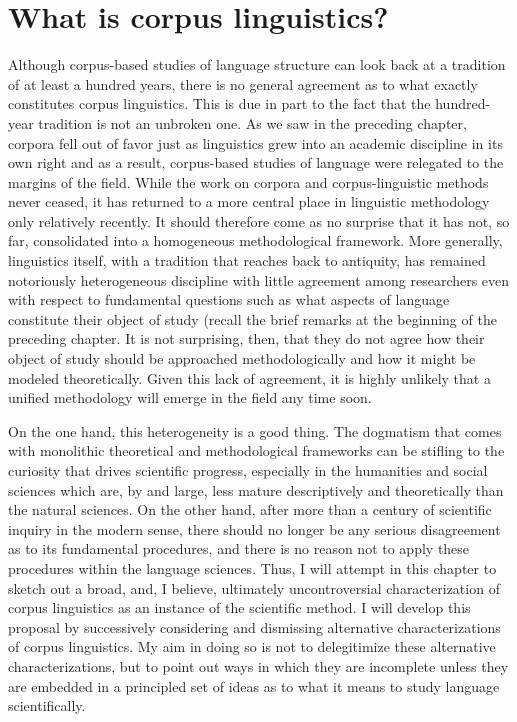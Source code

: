\chapter{What is corpus linguistics?}
\label{ch:corpuslinguistics}

Although corpus-based studies of language structure can look back at a tradition of at least a hundred years, there is no general agreement as to what exactly constitutes corpus linguistics. This is due in part to the fact that the hundred-year tradition is not an unbroken one. As we saw in the preceding chapter, corpora fell out of favor just as linguistics grew into an academic discipline in its own right and as a result, corpus-based studies of language were relegated to the margins of the field. While the work on corpora and corpus-linguistic methods never ceased, it has returned to a more central place in linguistic methodology only relatively recently. It should therefore come as no surprise that it has not, so far, consolidated into a homogeneous methodological framework. More generally, linguistics itself, with a tradition that reaches back to antiquity, has remained notoriously heterogeneous discipline with little agreement among researchers even with respect to fundamental questions such as what aspects of language constitute their object of study (recall the brief remarks at the beginning of the preceding chapter. It is not surprising, then, that they do not agree how their object of study should be approached methodologically and how it might be modeled theoretically. Given this lack of agreement, it is highly unlikely that a unified methodology will emerge in the field any time soon.

On the one hand, this heterogeneity is a good thing. The dogmatism that comes with monolithic theoretical and methodological frameworks can be stifling to the curiosity that drives scientific progress, especially in the humanities and social sciences which are, by and large, less mature descriptively and theoretically than the natural sciences. On the other hand, after more than a century of scientific inquiry in the modern sense, there should no longer be any serious disagreement as to its fundamental procedures, and there is no reason not to apply these procedures within the language sciences. Thus, I will attempt in this chapter to sketch out a broad, and, I believe, ultimately uncontroversial characterization of corpus linguistics as an instance of the scientific method. I will develop this proposal by successively considering and dismissing alternative characterizations of corpus linguistics. My aim in doing so is not to delegitimize these alternative characterizations, but to point out ways in which they are incomplete unless they are embedded in a principled set of ideas as to what it means to study language scientifically.

